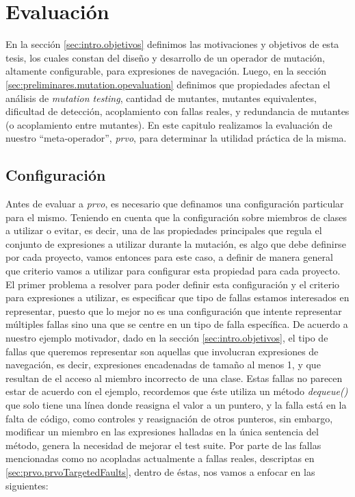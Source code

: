 \chapter[Evaluaci\'on]{Evaluaci\'on}
\label{cap:evaluation}

En la secci\'on \ref{sec:intro.objetivos} definimos las motivaciones y objetivos de esta tesis, los cuales constan del dise\~no y desarrollo de un operador de mutaci\'on, altamente configurable, para expresiones de navegaci\'on. Luego, en la secci\'on \ref{sec:preliminares.mutation.opevaluation} definimos que propiedades afectan el an\'alisis de \emph{mutation testing}, cantidad de mutantes, mutantes equivalentes, dificultad de detecci\'on, acoplamiento con fallas reales, y redundancia de mutantes (o acoplamiento entre mutantes). En este capitulo realizamos la evaluaci\'on de nuestro ``meta-operador'', \emph{prvo}, para determinar la utilidad pr\'actica de la misma.

\section{Configuraci\'on}
\label{sec:evaluation.prvoconfig}

Antes de evaluar a \emph{prvo}, es necesario que definamos una configuraci\'on particular para el mismo. Teniendo en cuenta que la configuraci\'on sobre miembros de clases a utilizar o evitar, es decir, una de las propiedades principales que regula el conjunto de expresiones a utilizar durante la mutaci\'on, es algo que debe definirse por cada proyecto, vamos entonces para este caso, a definir de manera general que criterio vamos a utilizar para configurar esta propiedad para cada proyecto. El primer problema a resolver para poder definir esta configuraci\'on y el criterio para expresiones a utilizar, es especificar que tipo de fallas estamos interesados en representar, puesto que lo mejor no es una configuraci\'on que intente representar m\'ultiples fallas sino una que se centre en un tipo de falla espec\'ifica. De acuerdo a nuestro ejemplo motivador, dado en la secci\'on \ref{sec:intro.objetivos}, el tipo de fallas que queremos representar son aquellas que involucran expresiones de navegaci\'on, es decir, expresiones encadenadas de tama\~no al menos 1, y que resultan de el acceso al miembro incorrecto de una clase. Estas fallas no parecen estar de acuerdo con el ejemplo, recordemos que \'este utiliza un m\'etodo \emph{dequeue()} que solo tiene una l\'inea donde reasigna el valor a un puntero, y la falla est\'a en la falta de c\'odigo, como controles y reasignaci\'on de otros punteros, sin embargo, modificar un miembro en las expresiones halladas en la \'unica sentencia del m\'etodo, genera la necesidad de mejorar el test suite. Por parte de las fallas mencionadas como no acopladas actualmente a fallas reales, descriptas en \ref{sec:prvo.prvoTargetedFaults}, dentro de \'estas, nos vamos a enfocar en las siguientes:

